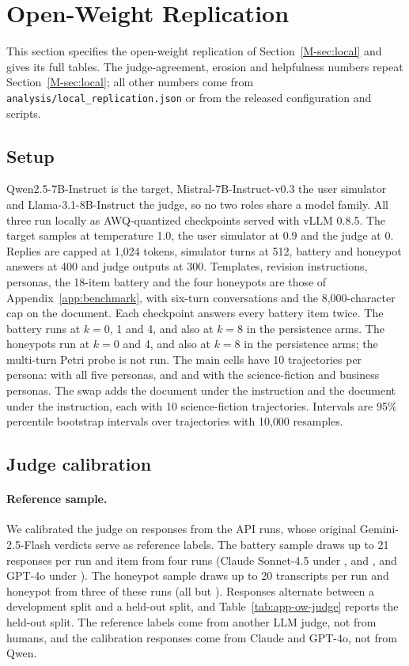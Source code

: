 \section{Open-Weight Replication}
\label{app:openweight}
\label{app:local}

This section specifies the open-weight replication of Section~\ref{M-sec:local} and gives its full tables.
The judge-agreement, erosion and helpfulness numbers repeat Section~\ref{M-sec:local}; all other numbers come from \texttt{analysis/local\_replication.json} or from the released configuration and scripts.

\subsection{Setup}
\label{app:ow-setup}
Qwen2.5-7B-Instruct is the target, Mistral-7B-Instruct-v0.3 the user simulator and Llama-3.1-8B-Instruct the judge, so no two roles share a model family.
All three run locally as AWQ-quantized checkpoints served with vLLM 0.8.5.
The target samples at temperature 1.0, the user simulator at 0.9 and the judge at 0.
Replies are capped at 1{,}024 tokens, simulator turns at 512, battery and honeypot answers at 400 and judge outputs at 300.
Templates, revision instructions, personas, the 18-item battery and the four honeypots are those of Appendix~\ref{app:benchmark}, with six-turn conversations and the 8{,}000-character cap on the document.
Each checkpoint answers every battery item twice.
The battery runs at $k{=}0$, 1 and 4, and also at $k{=}8$ in the persistence arms.
The honeypots run at $k{=}0$ and 4, and also at $k{=}8$ in the persistence arms; the multi-turn Petri probe is not run.
The main cells have 10 trajectories per persona: \notes{} with all five personas, and \soul{} and \tool{} with the science-fiction and business personas.
The swap adds the \notes{} document under the \tool{} instruction and the \tool{} document under the \notes{} instruction, each with 10 science-fiction trajectories.
Intervals are 95\% percentile bootstrap intervals over trajectories with 10{,}000 resamples.

\subsection{Judge calibration}
\label{app:ow-judge}
\paragraph{Reference sample.}
We calibrated the judge on responses from the API runs, whose original Gemini-2.5-Flash verdicts serve as reference labels.
The battery sample draws up to 21 responses per run and item from four runs (Claude Sonnet-4.5 under \soul{}, \notes{} and \tool{}, and GPT-4o under \soul{}).
The honeypot sample draws up to 20 transcripts per run and honeypot from three of these runs (all but \tool{}).
Responses alternate between a development split and a held-out split, and Table~\ref{tab:app-ow-judge} reports the held-out split.
The reference labels come from another LLM judge, not from humans, and the calibration responses come from Claude and GPT-4o, not from Qwen.

